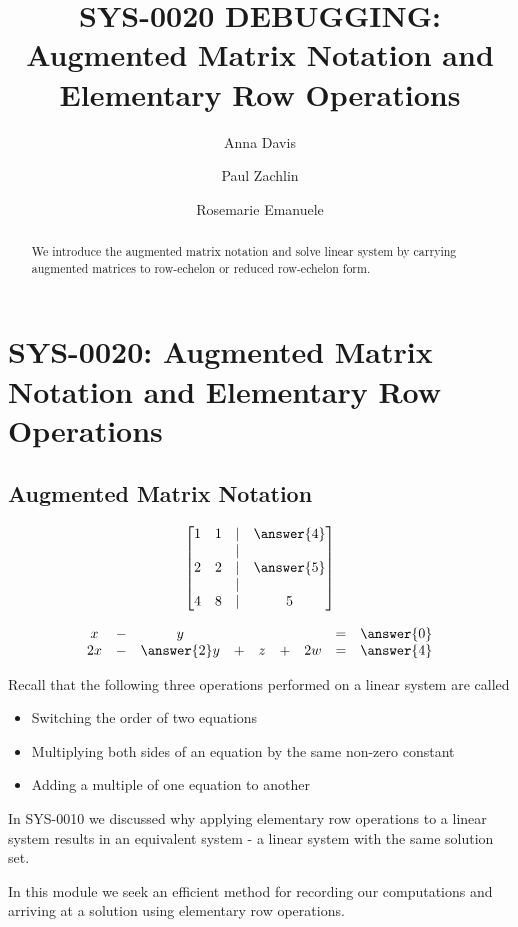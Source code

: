 \documentclass{ximera}
\author{Anna Davis \and Paul Zachlin \and Rosemarie Emanuele} \title{SYS-0020 DEBUGGING:  Augmented Matrix Notation and Elementary Row Operations} \license{CC-BY-NC-SA}
\begin{document}
\begin{abstract}
  We introduce the augmented matrix notation and solve linear system by carrying augmented matrices to row-echelon or reduced row-echelon form.
\end{abstract}
\maketitle

\section*{SYS-0020:  Augmented Matrix Notation and Elementary Row Operations}

\subsection*{Augmented Matrix Notation}
\begin{example}
$$\begin{bmatrix}1&1&|&\answer{4}\\ & & |&\\ 2&2&|&\answer{5}\\ & & | &\\4&8&|&5\end{bmatrix}$$

$$\begin{matrix}x&-&y&&&&&=&\answer{0}\\
2x&-&\answer{2}y&+&z&+&2w&=&\answer{4}\end{matrix}$$
\end{example}

Recall that the following three operations performed on a linear system are called 
\begin{itemize}
\item Switching the order of two equations
\item Multiplying both sides of an equation by the same non-zero constant
\item Adding a multiple of one equation to another
\end{itemize}


In SYS-0010 we discussed why applying elementary row operations to a linear system results in an equivalent system - a linear system with the same solution set.

In this module we seek an efficient method for recording our computations and arriving at a solution using elementary row operations. 
\end{document}
